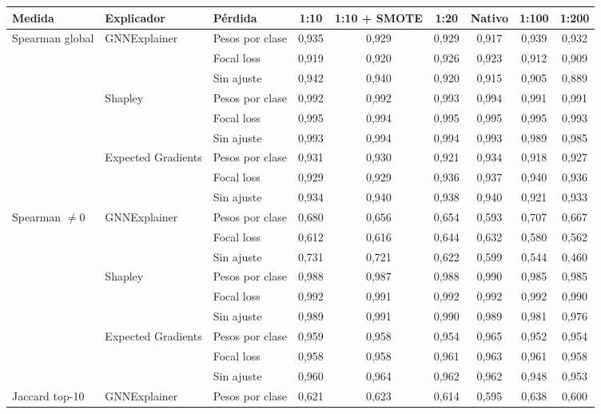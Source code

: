 \begin{tabular}{lllcccccc}
\toprule
Medida & Explicador & Pérdida & 1:10 & 1:10 + SMOTE & 1:20 & Nativo & 1:100 & 1:200 \\
\midrule
Spearman global & GNNExplainer & Pesos por clase & 0{,}935 & 0{,}929 & 0{,}929 & 0{,}917 & 0{,}939 & 0{,}932 \\
 &  & Focal loss & 0{,}919 & 0{,}920 & 0{,}926 & 0{,}923 & 0{,}912 & 0{,}909 \\
 &  & Sin ajuste & 0{,}942 & 0{,}940 & 0{,}920 & 0{,}915 & 0{,}905 & 0{,}889 \\
 & Shapley & Pesos por clase & 0{,}992 & 0{,}992 & 0{,}993 & 0{,}994 & 0{,}991 & 0{,}991 \\
 &  & Focal loss & 0{,}995 & 0{,}994 & 0{,}995 & 0{,}995 & 0{,}995 & 0{,}993 \\
 &  & Sin ajuste & 0{,}993 & 0{,}994 & 0{,}994 & 0{,}993 & 0{,}989 & 0{,}985 \\
 & Expected Gradients & Pesos por clase & 0{,}931 & 0{,}930 & 0{,}921 & 0{,}934 & 0{,}918 & 0{,}927 \\
 &  & Focal loss & 0{,}929 & 0{,}929 & 0{,}936 & 0{,}937 & 0{,}940 & 0{,}936 \\
 &  & Sin ajuste & 0{,}934 & 0{,}940 & 0{,}938 & 0{,}940 & 0{,}921 & 0{,}933 \\
\midrule
Spearman $\neq 0$ & GNNExplainer & Pesos por clase & 0{,}680 & 0{,}656 & 0{,}654 & 0{,}593 & 0{,}707 & 0{,}667 \\
 &  & Focal loss & 0{,}612 & 0{,}616 & 0{,}644 & 0{,}632 & 0{,}580 & 0{,}562 \\
 &  & Sin ajuste & 0{,}731 & 0{,}721 & 0{,}622 & 0{,}599 & 0{,}544 & 0{,}460 \\
 & Shapley & Pesos por clase & 0{,}988 & 0{,}987 & 0{,}988 & 0{,}990 & 0{,}985 & 0{,}985 \\
 &  & Focal loss & 0{,}992 & 0{,}991 & 0{,}992 & 0{,}992 & 0{,}992 & 0{,}990 \\
 &  & Sin ajuste & 0{,}989 & 0{,}991 & 0{,}990 & 0{,}989 & 0{,}981 & 0{,}976 \\
 & Expected Gradients & Pesos por clase & 0{,}959 & 0{,}958 & 0{,}954 & 0{,}965 & 0{,}952 & 0{,}954 \\
 &  & Focal loss & 0{,}958 & 0{,}958 & 0{,}961 & 0{,}963 & 0{,}961 & 0{,}958 \\
 &  & Sin ajuste & 0{,}960 & 0{,}964 & 0{,}962 & 0{,}962 & 0{,}948 & 0{,}953 \\
\midrule
Jaccard top-10 & GNNExplainer & Pesos por clase & 0{,}621 & 0{,}623 & 0{,}614 & 0{,}595 & 0{,}638 & 0{,}600 \\

\end{tabular}
